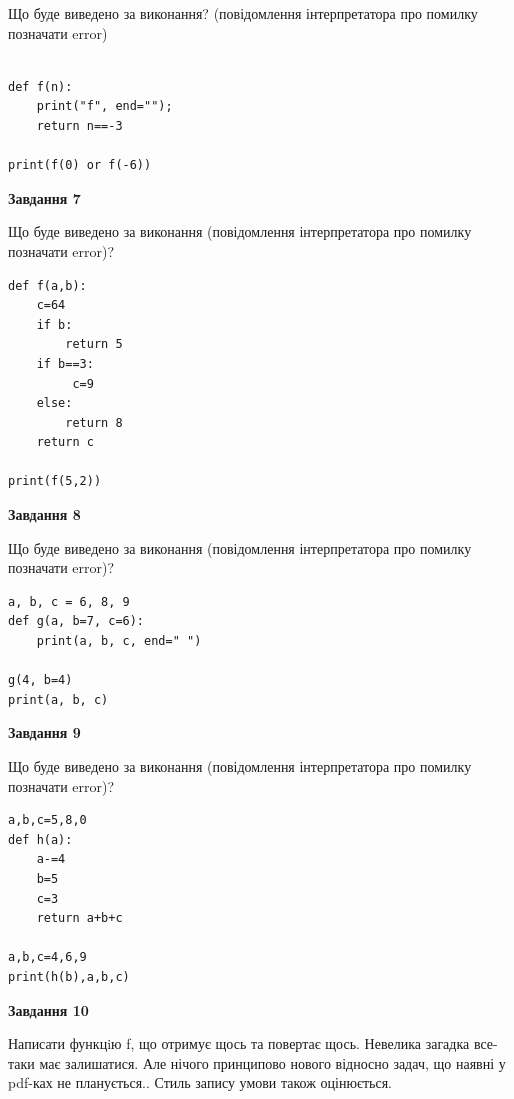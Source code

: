 \documentclass[12pt, ukrainian]{article}
\begin{document}
{\begin {large}
Що буде виведено за виконання? (повідомлення інтерпретатора про помилку позначати error)\par
\begin{verbatim}

def f(n):
    print("f", end="");
    return n==-3

print(f(0) or f(-6))
\end{verbatim}

{\begin {center}\textbf{Завдання 7}\end {center}}

Що буде виведено за виконання (повідомлення інтерпретатора про помилку позначати error)?\par
\begin{verbatim}
def f(a,b):
    c=64
    if b:
        return 5
    if b==3:
         c=9
    else: 
        return 8
    return c

print(f(5,2))
\end{verbatim}

{\begin {center}\textbf{Завдання 8}\end {center}}

Що буде виведено за виконання (повідомлення інтерпретатора про помилку позначати error)?\par
\begin{verbatim}
a, b, c = 6, 8, 9
def g(a, b=7, c=6):
    print(a, b, c, end=" ")

g(4, b=4)
print(a, b, c)
\end{verbatim}

{\begin {center}\textbf{Завдання 9}\end {center}}

Що буде виведено за виконання (повідомлення інтерпретатора про помилку позначати error)?\par
\begin{verbatim}
a,b,c=5,8,0
def h(a):
    a-=4
    b=5
    c=3
    return a+b+c

a,b,c=4,6,9
print(h(b),a,b,c)
\end{verbatim}

{\begin {center}\textbf{Завдання 10}\end {center}}


Написати функцiю f, що отримує щось та повертає щось. Невелика загадка все-таки має залишатися. Але нічого принципово нового відносно задач, що наявні у pdf-ках не планується.. Стиль запису умови також оцінюється.\par
\end {large}}
\newpage
\end{document}

